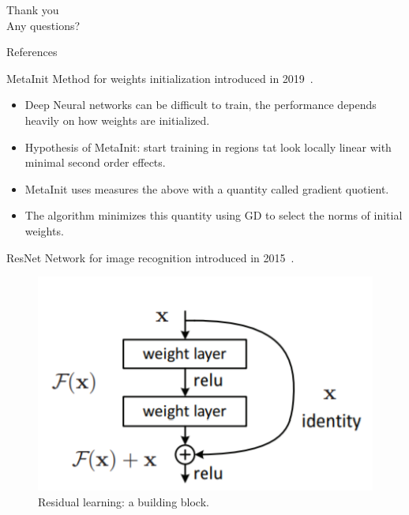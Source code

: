 \documentclass[10pt]{beamer}
\begin{document}
\begin{frame}{ }
\begin{center}
    \Huge Thank you\\ Any questions?
\end{center}
   
\end{frame}


\begin{frame}[allowframebreaks]{References}
		\renewcommand*{\bibfont}{\tiny}
		
\end{frame}

\begin{frame}{MetaInit}
    Method for weights initialization introduced in 2019~\citep{dauphin2019metainit}.
    \begin{itemize}
        \item Deep Neural networks can be difficult to train, the performance depends heavily on how weights are initialized.
        \item Hypothesis of MetaInit: start training in regions tat look locally linear with minimal second order effects.
        \item MetaInit uses measures the above with a quantity called gradient quotient.
        \item The algorithm minimizes this quantity using GD to select the norms of initial weights.
    \end{itemize}
\end{frame}

\begin{frame}{ResNet}
    Network for image recognition introduced in 2015~\citep{he2015residual}.
    
    \begin{figure}
        \centering
        \includegraphics[scale=1]{midterm presentation/images/building_block_ResNet.png}
        \caption{Residual learning: a building block.}
        \label{fig:building_block_resnet}
    \end{figure}
    
    
\end{frame}
\end{document}
